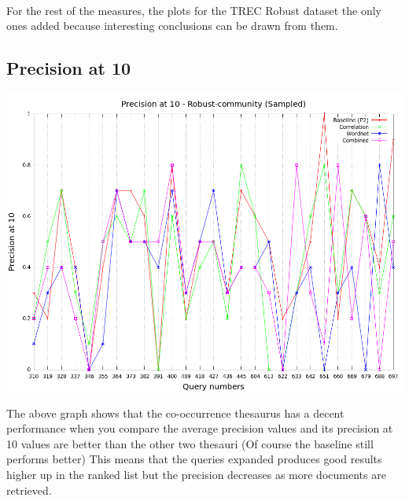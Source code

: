 \documentclass[a4paper, 12pt, notitlepage]{report}
\begin{document}
\paragraph{}
For the rest of the measures, the plots for the TREC Robust dataset the only ones added because interesting conclusions can be drawn from them.

\subsection*{Precision at 10}
\begin{center}
\includegraphics[scale = 0.4]{sampled-robust-comm_prec10}
\end{center}

The above graph shows that the co-occurrence thesaurus has a decent performance when you compare the average precision values and its precision at 10 values are better than the other two thesauri (Of course the baseline still performs better) This means that the queries expanded produces good results higher up in the ranked list but the precision decreases as more documents are retrieved.  
\end{document}
